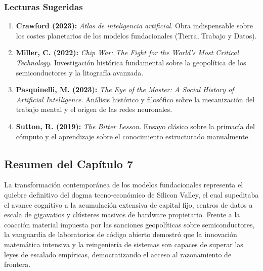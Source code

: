 \subsubsection*{Lecturas Sugeridas}
\begin{enumerate}[leftmargin=1.5em, itemsep=0.15cm]
    \item \textbf{Crawford (2023):} \textit{Atlas de inteligencia artificial}. Obra indispensable sobre los costes planetarios de los modelos fundacionales (Tierra, Trabajo y Datos).
    \item \textbf{Miller, C. (2022):} \textit{Chip War: The Fight for the World's Most Critical Technology}. Investigación histórica fundamental sobre la geopolítica de los semiconductores y la litografía avanzada.
    \item \textbf{Pasquinelli, M. (2023):} \textit{The Eye of the Master: A Social History of Artificial Intelligence}. Análisis histórico y filosófico sobre la mecanización del trabajo mental y el origen de las redes neuronales.
    \item \textbf{Sutton, R. (2019):} \textit{The Bitter Lesson}. Ensayo clásico sobre la primacía del cómputo y el aprendizaje sobre el conocimiento estructurado manualmente.
\end{enumerate}

\newpage
\subsection*{Resumen del Capítulo 7}

La transformación contemporánea de los modelos fundacionales representa el quiebre definitivo del dogma tecno-económico de Silicon Valley, el cual supeditaba el avance cognitivo a la acumulación extensiva de capital fijo, centros de datos a escala de gigavatios y clústeres masivos de hardware propietario. Frente a la coacción material impuesta por las sanciones geopolíticas sobre semiconductores, la vanguardia de laboratorios de código abierto demostró que la innovación matemática intensiva y la reingeniería de sistemas son capaces de superar las leyes de escalado empíricas, democratizando el acceso al razonamiento de frontera.

\vspace{0.25cm}

